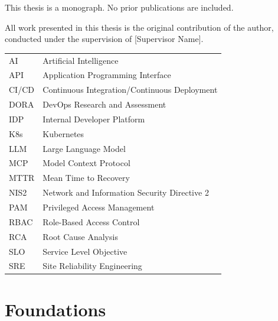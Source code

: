 \documentclass{TTUPhD}
\begin{document}
\frontmatter

\maketitlepage
\maketitlepageet
\makereversepage

\tableofcontents
\listoffigures
\listoftables

\begin{publications}
This thesis is a monograph. No prior publications are included.
\end{publications}

\begin{contributions}
All work presented in this thesis is the original contribution of the author, conducted under the supervision of [Supervisor Name].
\end{contributions}

\begin{abbreviations}
\begin{tabular}{ll}
AI & Artificial Intelligence \\
API & Application Programming Interface \\
CI/CD & Continuous Integration/Continuous Deployment \\
DORA & DevOps Research and Assessment \\
IDP & Internal Developer Platform \\
K8s & Kubernetes \\
LLM & Large Language Model \\
MCP & Model Context Protocol \\
MTTR & Mean Time to Recovery \\
NIS2 & Network and Information Security Directive 2 \\
PAM & Privileged Access Management \\
RBAC & Role-Based Access Control \\
RCA & Root Cause Analysis \\
SLO & Service Level Objective \\
SRE & Site Reliability Engineering \\
\end{tabular}
\end{abbreviations}

\mainmatter

\part{Foundations}


\end{document}
